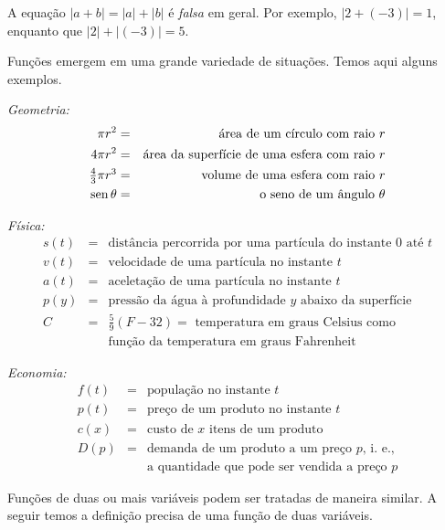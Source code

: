 \documentclass{svmono}
\begin{document}
\begin{warning}
A equação $|a + b| = |a|+|b|$ é \emph{falsa} em geral. Por exemplo,
$|2 + (-3)| = 1$, enquanto que $|2| + |(-3)| = 5$.
\end{warning}

Funções emergem em uma grande variedade de situações. Temos aqui
alguns exemplos.

\emph{Geometria:}
\begin{eqnarray*}
     \pi r^2 & = & \text{área de um círculo com raio } r \\
   4 \pi r^2 & = & \text{área da superfície de uma esfera com raio } r \\
\textstyle
   \frac{4}{3}\pi r^3 & = & \text{volume de uma esfera com raio } r \\
   \operatorname{sen} \theta & = & \text{o seno de um ângulo } \theta
\end{eqnarray*}

\emph{Física:}
\begin{eqnarray*}
  s(t) & = & \text{distância percorrida por uma partícula do instante } 0 \text{ até } t \\
  v(t) & = & \text{velocidade de uma partícula no instante } t \\
  a(t) & = & \text{aceletação de uma partícula no instante } t \\
  p(y) & = & \text{pressão da água à profundidade } y \text{ abaixo da superfície} \\
     C & = &\textstyle \frac{5}{9}(F - 32) = \text{ temperatura em graus Celsius como}\\
       &   & \text{função da temperatura em graus Fahrenheit}
\end{eqnarray*}

\emph{Economia:}
\begin{eqnarray*}
  f(t) & = & \text{população no instante } t \\
  p(t) & = & \text{preço de um produto no instante } t \\
  c(x) & = & \text{custo de } x \text{ itens de um produto} \\
  D(p) & = & \text{demanda de um produto a um preço } p \text{, i. e.,} \\
       &   & \text{a quantidade que pode ser vendida a preço } p
\end{eqnarray*}

Funções de duas ou mais variáveis podem ser tratadas de maneira
similar. A seguir temos a definição precisa de uma função de
duas variáveis.
\end{document}
